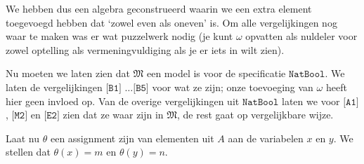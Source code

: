 \documentclass[a4paper,11pt]{article}
\begin{document}
We hebben dus een algebra geconstrueerd waarin we een extra element toegevoegd
hebben dat `zowel even als oneven' is. Om alle vergelijkingen nog waar te
maken was er wat puzzelwerk nodig (je kunt $\omega$ opvatten als nuldeler voor
zowel optelling als vermeningvuldiging als je er iets in wilt zien).

Nu moeten we laten zien dat $\mathfrak{M}$ een model is voor de specificatie
$\texttt{NatBool}$. We laten de vergelijkingen $\texttt{[B1] \ldots [B5]}$
voor wat ze zijn; onze toevoeging van $\omega$ heeft hier geen invloed
op. Van de overige vergelijkingen uit $\texttt{NatBool}$ laten we voor
$\texttt{[A1]}$, $\texttt{[M2]}$ en $\texttt{[E2]}$ zien dat ze waar zijn in
$\mathfrak{M}$, de rest gaat op vergelijkbare wijze.

Laat nu $\theta$ een assignment zijn van elementen uit $A$ aan de variabelen
$x$ en $y$. We stellen dat $\theta(x) = m$ en $\theta(y) = n$.
\end{document}
